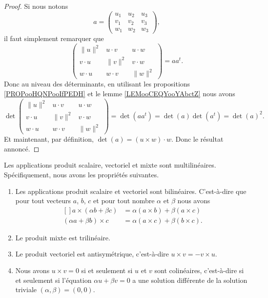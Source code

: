 \begin{proof}
	Si nous notons
	\begin{equation}
		a= \begin{pmatrix}
			u_1 & u_2 & u_3 \\
			v_1 & v_2 & v_3 \\
			w_1 & w_2 & w_3
		\end{pmatrix},
	\end{equation}
	il faut simplement remarquer que
	\begin{equation}
		\begin{pmatrix}
			\| u \|^2 & u\cdot v  & u\cdot w  \\
			v\cdot u  & \| v \|^2 & v\cdot w  \\
			w\cdot u  & w\cdot v  & \| w \|^2
		\end{pmatrix}=aa^t.
	\end{equation}
	Donc au niveau des déterminants, en utilisant les propositions \ref{PROPooHQNPooIfPEDH} et le lemme \ref{LEMooCEQYooYAbctZ} nous avons
	\begin{equation}
		\det\begin{pmatrix}
			\| u \|^2 & u\cdot v  & u\cdot w  \\
			v\cdot u  & \| v \|^2 & v\cdot w  \\
			w\cdot u  & w\cdot v  & \| w \|^2
		\end{pmatrix}=\det(aa^t)=\det(a)\det(a^t)=\det(a)^2.
	\end{equation}
	Et maintenant, par définition, \( \det(a)=(u\times w)\cdot w\). Donc le résultat annoncé.
\end{proof}

\begin{proposition}     \label{PropScalMixtLin}
	Les applications produit scalaire, vectoriel et mixte sont multilinéaires. Spécifiquement, nous avons les propriétés suivantes.
	\begin{enumerate}
		\item
		      Les applications produit scalaire et vectoriel sont bilinéaires. C'est-à-dire que pour tout vecteurs \( a\), \( b\), \( c\) et pour tout nombre \( \alpha\) et \( \beta\) nous avons
		      \begin{equation}
			      \begin{aligned}[]
				      a\times (\alpha b +\beta c) & =\alpha(a\times b)+\beta(a\times c)  \\
				      (\alpha a+\beta b)\times c  & =\alpha(a\times c)+\beta(b\times c).
			      \end{aligned}
		      \end{equation}

		\item
		      Le produit mixte est trilinéaire.
		\item
		      Le produit vectoriel est antisymétrique, c'est-à-dire \( u\times v=-v\times u\).
		\item
		      Nous avons \( u\times v=0\) si et seulement si \( u\) et \( v\) sont colinéaires, c'est-à-dire si et seulement si l'équation \( \alpha u+\beta v=0\) a une solution différente de la solution triviale \( (\alpha,\beta)=(0,0)\).
	\end{enumerate}
\end{proposition}

